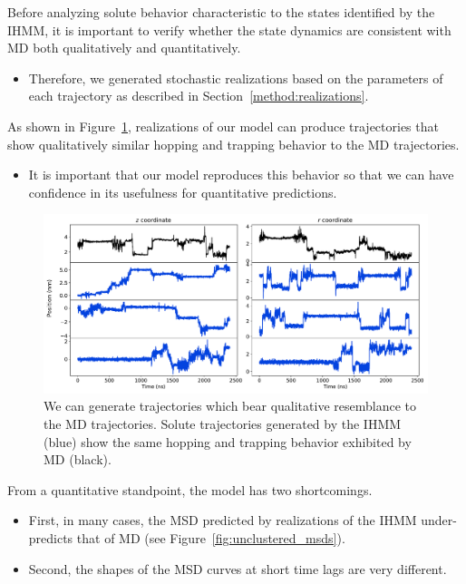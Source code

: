 \documentclass[journal=jpcbfk,manuscript=article]{achemso}
\begin{document}
  
  Before analyzing solute behavior characteristic to the states identified by the
  IHMM, it is important to verify whether the state dynamics are consistent with MD
  both qualitatively and quantitatively.
  \begin{itemize}
    \item Therefore, we generated stochastic realizations based on the parameters 
    of each trajectory as described in Section~\ref{method:realizations}.
  \end{itemize}
  
  As shown in Figure~\ref{fig:qualitative_unclustered}, realizations of our model 
  can produce trajectories that show qualitatively similar hopping and trapping 
  behavior to the MD trajectories.
  \begin{itemize}
    \item It is important that our model reproduces this behavior so that we can
    have confidence in its usefulness for quantitative predictions.
  \end{itemize}
  
  \begin{figure}
  \centering
  \includegraphics[width=\textwidth]{qualitative_unclustered_MET2.pdf}
  \caption{We can generate trajectories which bear qualitative resemblance to
  the MD trajectories. Solute trajectories generated by the IHMM (blue) show
  the same hopping and trapping behavior exhibited by MD (black).
  }\label{fig:qualitative_unclustered}
  \end{figure}
  
  \noindent From a quantitative standpoint, the model has two shortcomings.
  \begin{itemize}
  	\item First, in many cases, the MSD predicted by realizations of the IHMM 
  	under-predicts that of MD (see Figure~\ref{fig:unclustered_msds}).
  	\item Second, the shapes of the MSD curves at short time lags are very different.
  \end{itemize}
  
\end{document}
